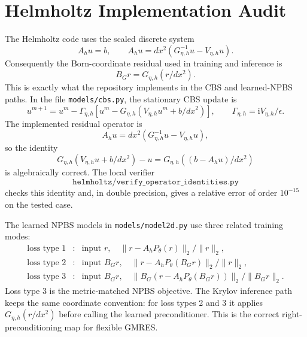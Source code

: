 \documentclass[11pt]{article}
\newcommand{\ii}{\mathrm{i}}
\begin{document}
\section{Helmholtz Implementation Audit}

The Helmholtz code uses the scaled discrete system
\[
  A_hu=b,\qquad
  A_hu = dx^2\left(G_{\eta,h}^{-1}u - V_{\eta,h}u\right).
\]
Consequently the Born-coordinate residual used in training and inference is
\[
  B_G r = G_{\eta,h}(r/dx^2).
\]
This is exactly what the repository implements in the CBS and learned-NPBS
paths.  In the file \texttt{models/cbs.py}, the stationary CBS update is
\[
  u^{m+1}
  =
  u^m-\Gamma_{\eta,h}\left[
    u^m-G_{\eta,h}\left(V_{\eta,h}u^m+b/dx^2\right)
  \right],
  \qquad
  \Gamma_{\eta,h}=\ii V_{\eta,h}/\epsilon.
\]
The implemented residual operator is
\[
  A_hu = dx^2(G_{\eta,h}^{-1}u-V_{\eta,h}u),
\]
so the identity
\[
  G_{\eta,h}\left(V_{\eta,h}u+b/dx^2\right)-u
  =
  G_{\eta,h}\left((b-A_hu)/dx^2\right)
\]
is algebraically correct.  The local verifier
\[
  \texttt{helmholtz/verify\_operator\_identities.py}
\]
checks this identity and, in double precision, gives a relative error of order
\(10^{-15}\) on the tested case.

The learned NPBS models in \texttt{models/model2d.py} use three related
training modes:
\[
\begin{array}{ccl}
\text{loss type 1} &:& \text{input }r,\quad
  \|r-A_hP_\theta(r)\|_2/\|r\|_2,\\[2mm]
\text{loss type 2} &:& \text{input }B_Gr,\quad
  \|r-A_hP_\theta(B_Gr)\|_2/\|r\|_2,\\[2mm]
\text{loss type 3} &:& \text{input }B_Gr,\quad
  \|B_G(r-A_hP_\theta(B_Gr))\|_2/\|B_Gr\|_2.
\end{array}
\]
Loss type 3 is the metric-matched NPBS objective.  The Krylov inference path
keeps the same coordinate convention: for loss types 2 and 3 it applies
\(G_{\eta,h}(r/dx^2)\) before calling the learned preconditioner.  This is the
correct right-preconditioning map for flexible GMRES.
\end{document}

